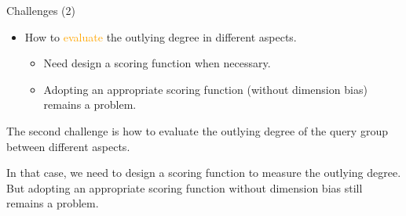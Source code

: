\documentclass[
size=14pt,
paper=smartboard,  %
mode=present, 		%
display=slides, 	%
style=tuliplab,  	%
pauseslide,
fleqn,leqno]{powerdot}
\begin{document}
	
	\begin{slide}[toc=,bm=]{Challenges (2)}
		
		\begin{itemize}
			\item
			How to \textcolor{orange}{evaluate} the outlying degree in different aspects.
			
			\begin{itemize}
				\item
				Need design a scoring function when necessary.
				
				\item
				Adopting an appropriate scoring function (without dimension bias) remains a problem.
				
			\end{itemize}
		\end{itemize}
		
		\begin{note}
			The second challenge is how to evaluate the outlying degree of
			the query group between different aspects.
			
			In that case,
			we need to design a scoring function to measure the outlying degree.
			But adopting an appropriate scoring function without dimension bias still remains a problem.
		\end{note}
		
	\end{slide}
	
\end{document}
